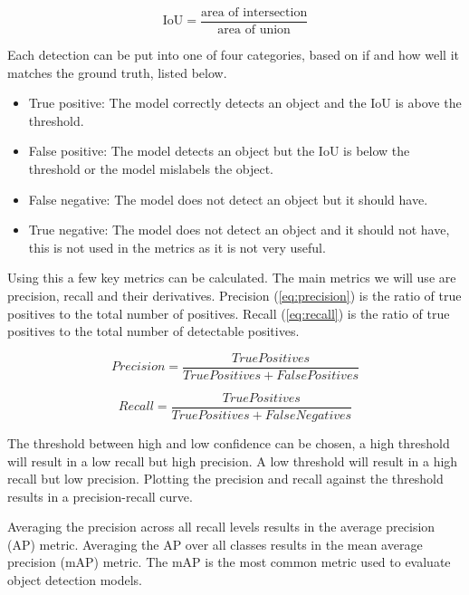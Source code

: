 \begin{equation}
	\text{IoU} = \frac{\text{area of intersection}}{\text{area of union}}
	\label{eq:IoU}
\end{equation}

Each detection can be put into one of four categories, based on if and how well it matches the ground truth, listed below.

\begin{itemize}
	\item True positive: The model correctly detects an object and the IoU is above the threshold.
	\item False positive: The model detects an object but the IoU is below the threshold or the model mislabels the object.
	\item False negative: The model does not detect an object but it should have.
	\item True negative: The model does not detect an object and it should not have, this is not used in the metrics as it is not very useful.
\end{itemize}

Using this a few key metrics can be calculated. The main metrics we will use are precision, recall and their derivatives. Precision (\ref{eq:precision}) is the ratio of true positives to the total number of positives. Recall (\ref{eq:recall}) is the ratio of true positives to the total number of detectable positives.



\begin{equation}
	Precision = \frac{TruePositives}{True Positives + False Positives}
	\label{eq:precision}
\end{equation}

\begin{equation}
	Recall = \frac{True Positives}{True Positives + False Negatives}
	\label{eq:recall}
\end{equation}

The threshold between high and low confidence can be chosen, a high threshold will result in a low recall but high precision. A low threshold will result in a high recall but low precision. Plotting the precision and recall against the threshold results in a precision-recall curve.

Averaging the precision across all recall levels results in the average precision (AP) metric. Averaging the AP over all classes results in the mean average precision (mAP) metric. The mAP is the most common metric used to evaluate object detection models.

